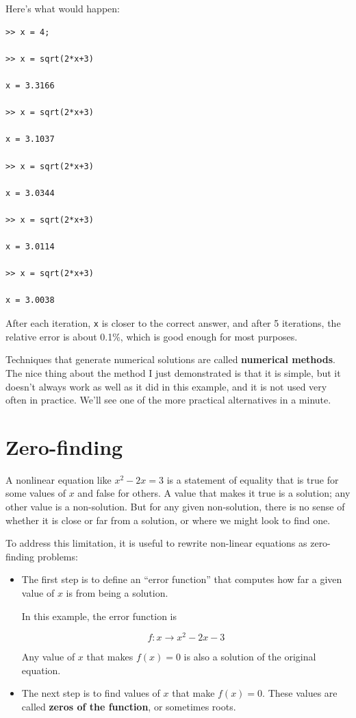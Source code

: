 \documentclass{book}
\begin{document}
Here's what would happen:

\begin{verbatim}
>> x = 4;

>> x = sqrt(2*x+3)

x = 3.3166

>> x = sqrt(2*x+3)

x = 3.1037

>> x = sqrt(2*x+3)

x = 3.0344

>> x = sqrt(2*x+3)

x = 3.0114

>> x = sqrt(2*x+3)

x = 3.0038
\end{verbatim}

After each iteration, {\tt x} is closer to the correct answer,
and after 5 iterations, the relative error is about 0.1\%, which
is good enough for most purposes.

Techniques that generate numerical solutions are called
{\bf numerical methods}.  The nice thing about the method I
just demonstrated is that it is simple, but it doesn't always
work as well as it did in this example, and it is not used
very often in practice.  We'll see one of
the more practical alternatives in a minute.




\section{Zero-finding}
\label{zero}

A nonlinear equation like $x^2 - 2x = 3$ is a statement of
equality that is true for some values of $x$ and false for
others.  A value that makes it true is a solution;
any other value is a non-solution.  But for any given non-solution,
there is no sense of whether it is close or far from a solution,
or where we might look to find one.

To address this limitation, it is useful to
rewrite non-linear equations as zero-finding problems:

\begin{itemize}

\item The first step is to define
an ``error function'' that computes how far
a given value of $x$ is from being a solution.

In this example, the error function is

\[ f : x \to x^2 - 2x -3 \]

Any value of $x$ that makes $f(x) = 0$ is also a solution
of the original equation.

\item The next step is to find values of $x$ that make
$f(x) = 0$.  These values are called {\bf zeros of the
function}, or sometimes roots.

\end{itemize}
\end{document}
